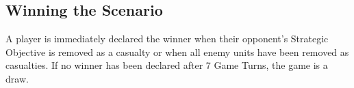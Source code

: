 

\subsection*{Winning the Scenario}

A player is immediately declared the winner when their opponent's Strategic Objective is removed as a casualty or when all enemy units have been removed as casualties. If no winner has been declared after 7 Game Turns, the game is a draw.
